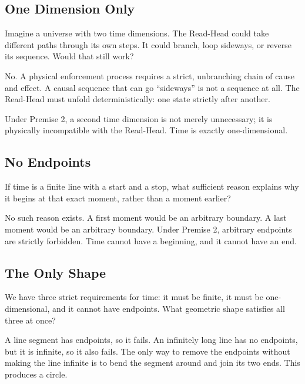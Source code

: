 \documentclass[11pt]{article}
\theoremstyle{canonstyle}
\begin{document}
\subsection{One Dimension Only}

\begin{reflect}
Imagine a universe with two time dimensions. The Read-Head could take different paths through its own steps. It could branch, loop sideways, or reverse its sequence. Would that still work?
\end{reflect}

No. A physical enforcement process requires a strict, unbranching chain of cause and effect. A causal sequence that can go ``sideways'' is not a sequence at all. The Read-Head must unfold deterministically: one state strictly after another. 

Under Premise 2, a second time dimension is not merely unnecessary; it is physically incompatible with the Read-Head. Time is exactly one-dimensional.

\subsection{No Endpoints}

\begin{reflect}
If time is a finite line with a start and a stop, what sufficient reason explains why it begins at that exact moment, rather than a moment earlier?
\end{reflect}

No such reason exists. A first moment would be an arbitrary boundary. A last moment would be an arbitrary boundary. Under Premise 2, arbitrary endpoints are strictly forbidden. Time cannot have a beginning, and it cannot have an end.

\subsection{The Only Shape}

\begin{reflect}
We have three strict requirements for time: it must be finite, it must be one-dimensional, and it cannot have endpoints. What geometric shape satisfies all three at once?
\end{reflect}

A line segment has endpoints, so it fails. An infinitely long line has no endpoints, but it is infinite, so it also fails. The only way to remove the endpoints without making the line infinite is to bend the segment around and join its two ends. This produces a circle. 
\end{document}
